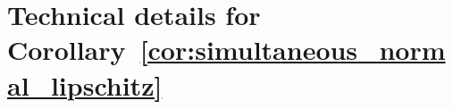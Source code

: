 \documentclass[twoside,11pt]{article}
\newlength{\widebarargwidth}
\newlength{\widebarargheight}
\newlength{\widebarargdepth}
\DeclareRobustCommand{\widebar}[1]{%
  \settowidth{\widebarargwidth}{\ensuremath{#1}}%
  \settoheight{\widebarargheight}{\ensuremath{#1}}%
  \settodepth{\widebarargdepth}{\ensuremath{#1}}%
  \addtolength{\widebarargwidth}{-0.3\widebarargheight}%
  \addtolength{\widebarargwidth}{-0.3\widebarargdepth}%
  \makebox[0pt][l]{\hspace{0.3\widebarargheight}%
    \hspace{0.3\widebarargdepth}%
    \addtolength{\widebarargheight}{0.3ex}%
    \rule[\widebarargheight]{0.95\widebarargwidth}{0.1ex}}%
  {#1}}
\newcommand{\numobs}{\ensuremath{n}}
\def\EE{ \mathbb{E} }
\newcommand{\nstates}{s}
\newcommand{\pistat}{\ensuremath{\widebar{\pi}}}
\newcommand{\stat}{\pistat}
\newcommand{\statmin}{\stat_{\min}}
\newcommand{\mixcoefeps}{\ensuremath{\epsilon_{\mathrm{mix}}}}
\newcommand{\paramjoint}{\theta}
\newcommand{\paramjointone}{\paramjoint}
\newcommand{\paramjointtwo}{\paramjoint'}
\newcommand{\qfunk}[1]{\ensuremath{\QBAR^{#1}}}
\newcommand{\eqfunn}[1]{\ensuremath{\mathbb{E}Q_{#1}}}
\newcommand{\qnorm}[1]{\|#1\|_{\infty}}
\newcommand{\qfunpopextendk}{\qfunk{k}}                 %
\newcommand{\QBAR}{\ensuremath{\widebar{Q}}}
\newcommand{\HACKG}{\ensuremath{h}}
\begin{document}





\section{Technical details for Corollary~\ref{cor:simultaneous_normal_lipschitz}}
\label{AppExponential}

\end{document}
